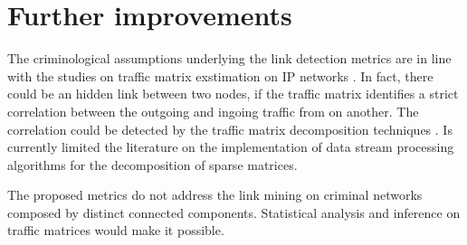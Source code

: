 \section{Further improvements}
\label{sec:further-improvements}

The criminological assumptions underlying the link detection metrics are in line with the studies on traffic matrix exstimation on IP networks \cite{medina2002traffic,benameur2004traffic,papagiannaki2004distributed}. 
In fact, there could be an hidden link between two nodes, if the traffic matrix identifies a strict correlation between the outgoing and ingoing traffic from on another. The correlation could be detected by the traffic matrix decomposition techniques \cite{elgamal2015analysis,jiang2015covariance}.
Is currently limited the literature on the implementation of data stream processing algorithms for the decomposition of sparse matrices.

The proposed metrics do not address the link mining on criminal networks composed by distinct connected components. Statistical analysis and inference on traffic matrices would make it possible.
